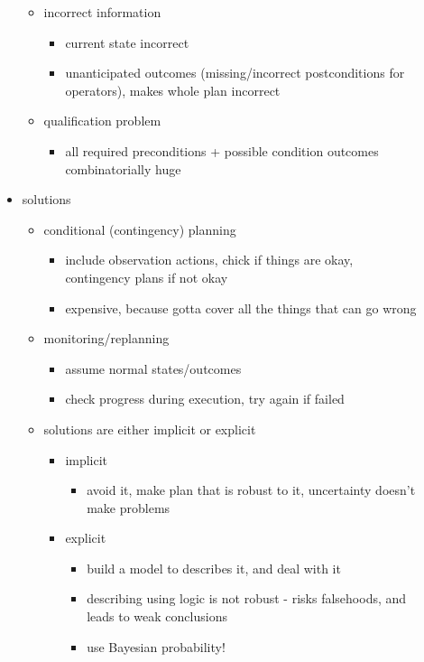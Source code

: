 \documentclass[11pt]{article}
\begin{document}
\begin{description}
\begin{itemize}
\begin{itemize}
		\item incorrect information
		\begin{itemize}
			\item current state incorrect
			\item unanticipated outcomes (missing/incorrect postconditions for operators), makes whole plan incorrect
		\end{itemize}
	
		\item qualification problem
		\begin{itemize}
			\item all required preconditions + possible condition outcomes combinatorially huge
		\end{itemize}
	\end{itemize}

	\item solutions
	\begin{itemize}
		\item conditional (contingency) planning
		\begin{itemize}
			\item include observation actions, chick if things are okay, contingency plans if not okay
			\item expensive, because gotta cover all the things that can go wrong
		\end{itemize}
	
		\item monitoring/replanning
		\begin{itemize}
			\item assume normal states/outcomes
			\item check progress during execution, try again if failed
		\end{itemize}
	
		\item solutions are either implicit or explicit
		\begin{itemize}
			\item implicit
			\begin{itemize}
				\item avoid it, make plan that is robust to it, uncertainty doesn't make problems
			\end{itemize}
		
			\item explicit
			\begin{itemize}
				\item build a model to describes it, and deal with it
				\item describing using logic is not robust - risks falsehoods, and leads to weak conclusions
				\item use Bayesian probability!


\end{itemize}
\end{itemize}
\end{itemize}
\end{itemize}
\end{description}
\end{document}
